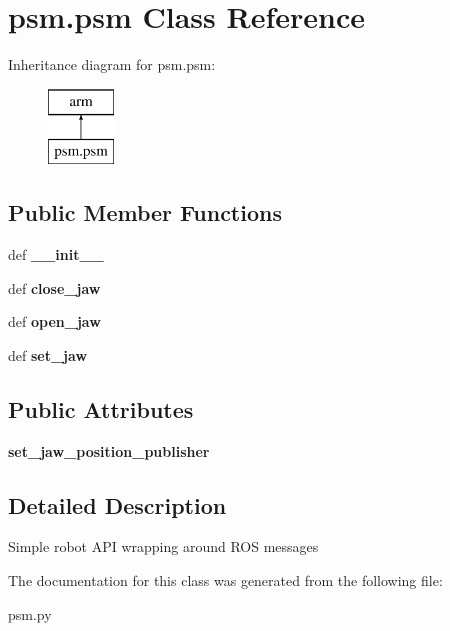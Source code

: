 \hypertarget{classpsm_1_1psm}{\section{psm.\-psm Class Reference}
\label{classpsm_1_1psm}
}
Inheritance diagram for psm.\-psm\-:\begin{figure}[H]
\begin{center}
\leavevmode
\includegraphics[height=2.000000cm]{classpsm_1_1psm}
\end{center}
\end{figure}
\subsection*{Public Member Functions}
\begin{DoxyCompactItemize}
\item 
\hypertarget{classpsm_1_1psm_a86afec832f80d1f08e6a6994c2942522}{def {\bfseries \-\_\-\-\_\-init\-\_\-\-\_\-}}\label{classpsm_1_1psm_a86afec832f80d1f08e6a6994c2942522}

\item 
\hypertarget{classpsm_1_1psm_a3fcfa4ee214b49701bcc24d167d4c8bc}{def {\bfseries close\-\_\-jaw}}\label{classpsm_1_1psm_a3fcfa4ee214b49701bcc24d167d4c8bc}

\item 
\hypertarget{classpsm_1_1psm_a5cca1190afe164269f5481b330e77e13}{def {\bfseries open\-\_\-jaw}}\label{classpsm_1_1psm_a5cca1190afe164269f5481b330e77e13}

\item 
\hypertarget{classpsm_1_1psm_a66a9d98a15f34996eaa88ffd32a1bac0}{def {\bfseries set\-\_\-jaw}}\label{classpsm_1_1psm_a66a9d98a15f34996eaa88ffd32a1bac0}

\end{DoxyCompactItemize}
\subsection*{Public Attributes}
\begin{DoxyCompactItemize}
\item 
\hypertarget{classpsm_1_1psm_a21845195746b53c80d7b49e011bde0c4}{{\bfseries set\-\_\-jaw\-\_\-position\-\_\-publisher}}\label{classpsm_1_1psm_a21845195746b53c80d7b49e011bde0c4}

\end{DoxyCompactItemize}


\subsection{Detailed Description}
\begin{DoxyVerb}Simple robot API wrapping around ROS messages
\end{DoxyVerb}
 

The documentation for this class was generated from the following file\-:\begin{DoxyCompactItemize}
\item 
psm.\-py\end{DoxyCompactItemize}
